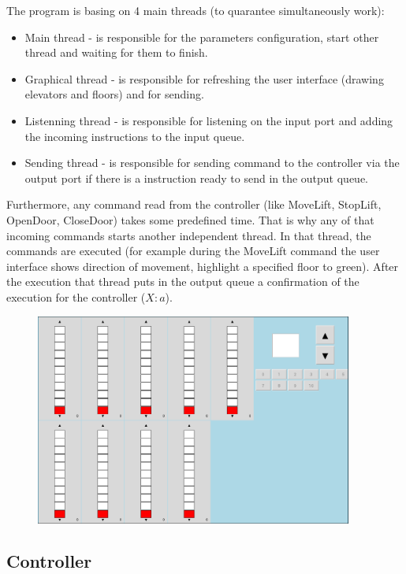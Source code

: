 \documentclass[12pt]{article}
\begin{document}
The program is basing on 4 main threads (to quarantee simultaneously work): 
\begin{itemize}
	\item Main thread - is responsible for the parameters configuration, start other thread and waiting for them to finish.
	\item Graphical thread - is responsible for refreshing the user interface (drawing elevators and floors) and for sending. 
	\item Listenning thread - is responsible for listening on the input port and adding the incoming instructions to the input queue.
	\item Sending thread - is responsible for sending command to the controller via the output port if there is a instruction ready to send in the output queue.		
\end{itemize}

Furthermore, any command read from the controller (like MoveLift, StopLift, OpenDoor, CloseDoor) takes some predefined time. That is why any of that incoming commands starts another independent thread. In that thread, the commands are executed (for example during the MoveLift command the user interface shows direction of movement, highlight a specified floor to green). After the execution that thread puts in the output queue a confirmation of the execution for the controller ($X:a$).
	\begin{figure}
	\includegraphics[width=0.93\textwidth]{img/winda.png}
	\end{figure}

\subsection{Controller}
\end{document}

